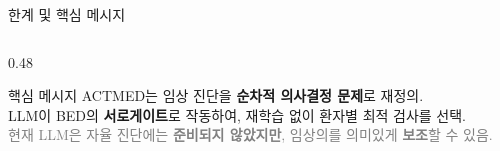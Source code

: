 \documentclass[
11pt,notheorems,hyperref={pdfauthor=whatever}
]{beamer}
\begin{document}
\begin{frame}{한계 및 핵심 메시지}
\begin{columns}[c]
\begin{column}{0.48\textwidth}
    \vspace{0.4em}

    \begin{block}{핵심 메시지}
    \small
    ACTMED는 임상 진단을 \textbf{순차적 의사결정 문제}로 재정의.\\[0.4em]
    LLM이 BED의 \textbf{서로게이트}로 작동하여, 재학습 없이 환자별 최적 검사를 선택.\\[0.4em]
    \textcolor{gray}{현재 LLM은 자율 진단에는 \textbf{준비되지 않았지만}, 임상의를 의미있게 \textbf{보조}할 수 있음.}
    \end{block}

\end{column}

\end{columns}
\end{frame}
\end{document}
